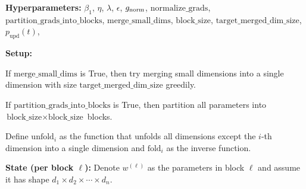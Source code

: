\begin{algorithm}[H]
  \caption{PSGD Kron}
  \label{alg:kron}
  \begin{tcolorbox}
  \textbf{Hyperparameters:}
  $\beta_{1}$, 
  $\eta$,
  $\lambda$,
  $\epsilon$,
  $g_{\mathrm{norm}}$,
  $\mathrm{normalize\_grads}$,
  $\text{partition\_grads\_into\_blocks}$,
  $\text{merge\_small\_dims}$,
  $\text{block\_size}$,
  $\text{target\_merged\_dim\_size}$,
  $p_{\mathrm{upd}}(t)$,


  \textbf{Setup:}

  If $\text{merge\_small\_dims}$ is True, then try merging small dimensions into a single dimension with size $\text{target\_merged\_dim\_size}$ greedily.

  If $\text{partition\_grads\_into\_blocks}$ is True, then partition all parameters into $\text{block\_size} \times \text{block\_size}$ blocks.

  Define $\text{unfold}_i$ as the function that unfolds all dimensions except the $i$-th dimension into a single dimension and $\text{fold}_i$ as the inverse function.


  \textbf{State (per block $\ell$):}
  Denote $w^{(\ell)}$ as the parameters in block $\ell$ and assume it has shape $d_1 \times d_2 \times \cdots \times d_n$.


\end{tcolorbox}
\end{algorithm}
